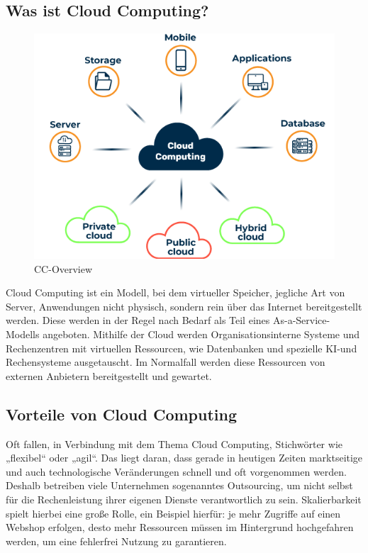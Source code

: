 \subsection{Was ist Cloud Computing?}

\begin{figure}[h]
    \centering
    \includegraphics[scale=0.9]{sections/cloud-computing/images/cc.png}
    \caption{CC-Overview}
    \label{fig:kimldl-comparison}
\end{figure}

Cloud Computing ist ein Modell, bei dem virtueller Speicher, jegliche Art von Server, Anwendungen nicht physisch, sondern rein über das Internet bereitgestellt werden. Diese werden in der Regel nach Bedarf als Teil eines As-a-Service-Modells angeboten. Mithilfe der Cloud werden Organisationsinterne Systeme und Rechenzentren mit virtuellen Ressourcen, wie Datenbanken und spezielle KI-und Rechensysteme ausgetauscht. Im Normalfall werden diese Ressourcen von externen Anbietern bereitgestellt und gewartet. 
\subsection{Vorteile von Cloud Computing}

Oft fallen, in Verbindung mit dem Thema Cloud Computing, Stichwörter wie „flexibel“ oder „agil“. Das liegt daran, dass gerade in heutigen Zeiten marktseitige und auch technologische Veränderungen schnell und oft vorgenommen werden. Deshalb betreiben viele Unternehmen sogenanntes Outsourcing, um nicht selbst für die Rechenleistung ihrer eigenen Dienste verantwortlich zu sein. Skalierbarkeit spielt hierbei eine große Rolle, ein Beispiel hierfür: je mehr Zugriffe auf einen Webshop erfolgen, desto mehr Ressourcen müssen im Hintergrund hochgefahren werden, um eine fehlerfrei Nutzung zu garantieren.

